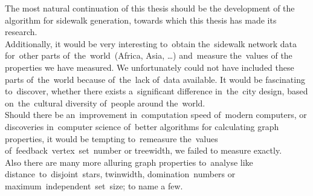 The most natural continuation of this thesis should be the development of the algorithm for sidewalk generation, towards which this thesis has made its research. \\
Additionally, it would be very interesting to~obtain the~sidewalk network data for~other parts of~the~world~(Africa, Asia, \dots) and~measure the~values of the properties we have measured. We unfortunately could not have included these parts of~the~world because of~the~lack of~data available. It would be fascinating to~discover, whether there exists a~significant difference in~the~city design, based on~the~cultural diversity of~people around the~world. \\
Should there be an~improvement in~computation speed of~modern computers, or discoveries in~computer science of~better algorithms for calculating graph properties, it would be tempting to~remeasure the~values of~feedback~vertex~set~number or treewidth, we failed to measure exactly. \\
Also there are many more alluring graph properties to~analyse like distance~to~disjoint~stars, twinwidth, domination~numbers or maximum~independent~set~size; to name a few.
